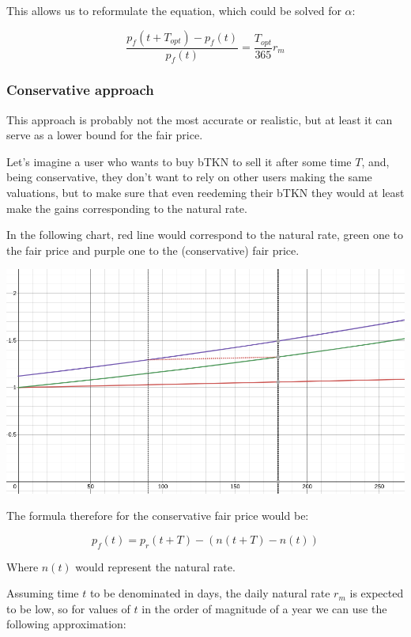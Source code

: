 \documentclass{article}
\begin{document}
This allows us to reformulate the equation, which could be solved for $\alpha$:

\begin{equation}
  \label{eq:yield-eq}
  \frac{p_f(t + T_{opt}) - p_f(t)}{p_f(t)} = \frac{T_{opt}}{365} r_m 
\end{equation}

\subsubsection{Conservative approach}
This approach is probably not the most accurate or realistic, but at least it can serve as a lower bound for the fair price.

Let’s imagine a user who wants to buy bTKN to sell it after some time $T$, and, being conservative, they don’t want to rely on other users making the same valuations, but to make sure that even reedeming their bTKN they would at least make the gains corresponding to the natural rate.

In the following chart, red line would correspond to the natural rate, green one to the fair price and purple one to the (conservative) fair price.

\includegraphics[width=\linewidth]{./ChickenBonds_Whitepaper_conservative_price.png}

The formula therefore for the conservative fair price would be:

\begin{equation}
  \label{eq:conservative-1}
p_f(t) = p_r(t + T) - (n(t+T) - n(t))
\end{equation}

Where $n(t)$ would represent the natural rate.

Assuming time $t$ to be denominated in days, the daily natural rate $r_m$ is expected to be low, so for values of $t$ in the order of magnitude of a year we can use the following approximation:
\end{document}
